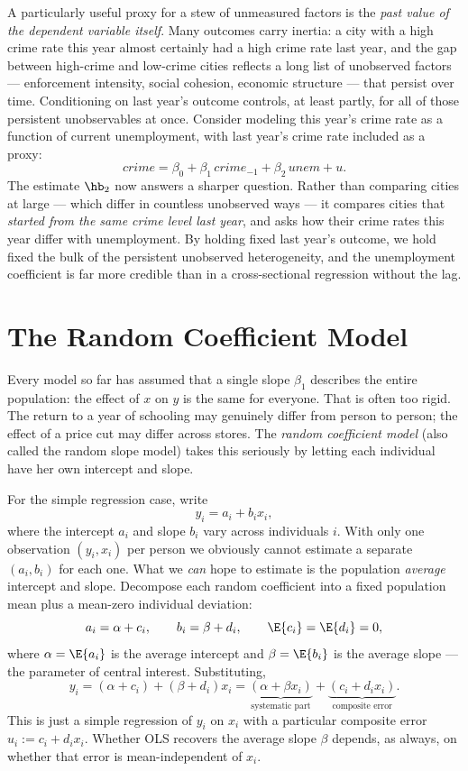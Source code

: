A particularly useful proxy for a stew of unmeasured factors is the \emph{past value of the dependent variable itself}. Many outcomes carry inertia: a city with a high crime rate this year almost certainly had a high crime rate last year, and the gap between high-crime and low-crime cities reflects a long list of unobserved factors --- enforcement intensity, social cohesion, economic structure --- that persist over time. Conditioning on last year's outcome controls, at least partly, for all of those persistent unobservables at once. Consider modeling this year's crime rate as a function of current unemployment, with last year's crime rate included as a proxy:
\[
\textit{crime} = \beta_0 + \beta_1\, \textit{crime}_{-1} + \beta_2\, \textit{unem} + u.
\]
The estimate $\hb_2$ now answers a sharper question. Rather than comparing cities at large --- which differ in countless unobserved ways --- it compares cities that \emph{started from the same crime level last year}, and asks how their crime rates this year differ with unemployment. By holding fixed last year's outcome, we hold fixed the bulk of the persistent unobserved heterogeneity, and the unemployment coefficient is far more credible than in a cross-sectional regression without the lag.

\section{The Random Coefficient Model}

Every model so far has assumed that a single slope $\beta_1$ describes the entire population: the effect of $x$ on $y$ is the same for everyone. That is often too rigid. The return to a year of schooling may genuinely differ from person to person; the effect of a price cut may differ across stores. The \emph{random coefficient model} (also called the random slope model) takes this seriously by letting each individual have her own intercept and slope.

For the simple regression case, write
\[
y_i = a_i + b_i x_i,
\]
where the intercept $a_i$ and slope $b_i$ vary across individuals $i$. With only one observation $(y_i,x_i)$ per person we obviously cannot estimate a separate $(a_i,b_i)$ for each one. What we \emph{can} hope to estimate is the population \emph{average} intercept and slope. Decompose each random coefficient into a fixed population mean plus a mean-zero individual deviation:
\[
a_i = \alpha + c_i, \qquad b_i = \beta + d_i, \qquad \E{c_i}=\E{d_i}=0,
\]
where $\alpha=\E{a_i}$ is the average intercept and $\beta=\E{b_i}$ is the average slope --- the parameter of central interest. Substituting,
\[
y_i = (\alpha + c_i) + (\beta + d_i)x_i = \underbrace{(\alpha + \beta x_i)}_{\text{systematic part}} + \underbrace{(c_i + d_i x_i)}_{\text{composite error}}.
\]
This is just a simple regression of $y_i$ on $x_i$ with a particular composite error $u_i := c_i + d_i x_i$. Whether OLS recovers the average slope $\beta$ depends, as always, on whether that error is mean-independent of $x_i$.

